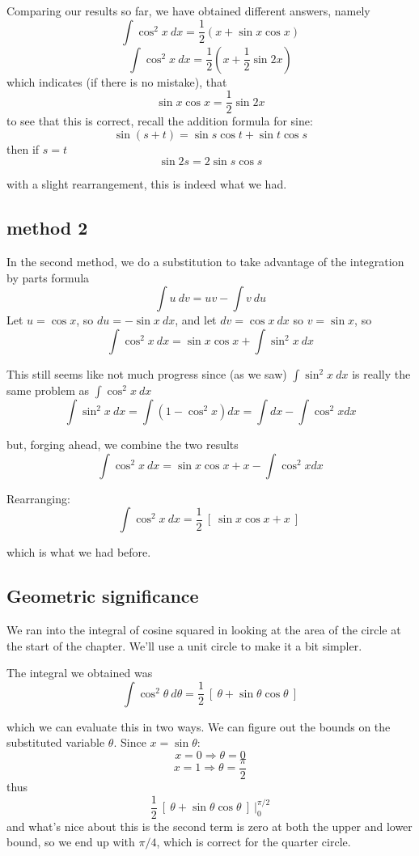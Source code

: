 \documentclass[11pt, oneside]{article}
\begin{document}
Comparing our results so far, we have obtained different answers, namely
\[ \int \cos^2 x \ dx = \frac{1}{2} (x + \sin x \cos x) \]
\[ \int \cos^2 x \ dx = \frac{1}{2} ( x + \frac{1}{2} \sin 2x ) \]
which indicates (if there is no mistake), that
\[ \sin x \cos x = \frac{1}{2} \sin 2x  \]
to see that this is correct, recall the addition formula for sine:
\[ \sin (s+t) = \sin s \cos t + \sin t \cos s \]
then if $s=t$
\[ \sin 2s = 2 \sin s \cos s  \]

with a slight rearrangement, this is indeed what we had.

\subsection*{method 2}
In the second method, we do a substitution to take advantage of the integration by parts formula
\[ \int u \ dv = uv - \int v \ du \]
Let $u=\cos x$, so $du = -\sin x \ dx$, and let $dv = \cos x \ dx$ so $v= \sin x$, so
\[ \int \cos^2 x \ dx = \sin x \cos x + \int \sin^2 x \ dx \]

This still seems like not much progress since (as we saw) $\int \sin^2 x \ dx$ is really the same problem as $\int \cos^2 x \ dx$
\[ \int \sin^2 x \ dx = \int (1 - \cos^2 x) dx = \int dx - \int \cos^2 x dx \]

but, forging ahead, we combine the two results
\[ \int \cos^2 x \ dx = \sin x \cos x + x -  \int \cos^2 x dx \]

Rearranging:
\[ \int \cos^2 x \ dx  = \frac{1}{2} \ [ \ \sin x \cos x + x \ ] \ \]

which is what we had before.

\subsection*{Geometric significance}
We ran into the integral of cosine squared in looking at the area of the circle at the start of the chapter.  We'll use a unit circle to make it a bit simpler.

The integral we obtained was
\[ \int \cos^2 \theta \ d \theta = \frac{1}{2} \ [ \ \theta + \sin \theta \cos \theta \ ] \]

which we can evaluate this in two ways.  We can figure out the bounds on the substituted variable $\theta$.  Since $x = \sin \theta$:
\[ x = 0 \Rightarrow \theta = 0 \]
\[ x = 1 \Rightarrow \theta = \frac{\pi}{2} \]
thus
\[ \frac{1}{2} \ [ \ \theta + \sin \theta \cos \theta \ ] \ \bigg |_0^{\pi/2} \]
and what's nice about this is the second term is zero at both the upper and lower bound, so we end up with $\pi/4$, which is correct for the quarter circle.
\end{document}
